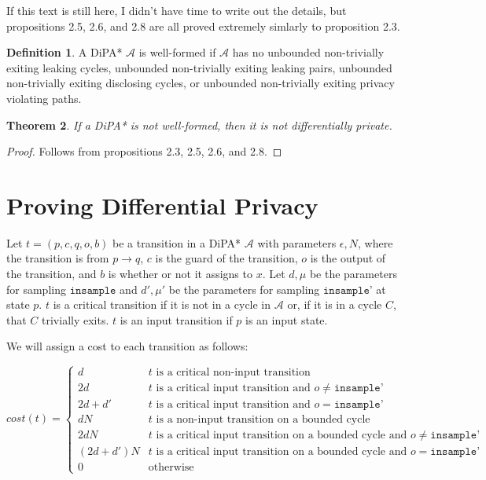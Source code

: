 \documentclass[12pt]{article}
\newtheorem{thm}{Theorem}[section]
\theoremstyle{definition}
\newtheorem{defn}[thm]{Definition}
\begin{document}
If this text is still here, I didn't have time to write out the details, but propositions 2.5, 2.6, and 2.8 are all proved extremely simlarly to proposition 2.3.

\begin{defn} 
	A DiPA* $\mathcal{A}$ is well-formed if $\mathcal{A}$ has no unbounded non-trivially exiting leaking cycles, unbounded non-trivially exiting leaking pairs, unbounded non-trivially exiting disclosing cycles, or unbounded non-trivially exiting privacy violating paths.
\end{defn}

\begin{thm} 
	If a DiPA* is not well-formed, then it is not differentially private.
\end{thm}
\begin{proof}
	Follows from propositions 2.3, 2.5, 2.6, and 2.8.
\end{proof}

\section{Proving Differential Privacy}

Let $t = (p, c, q, o, b)$ be a transition in a DiPA* $\mathcal{A}$ with parameters $\epsilon, N$, where the transition is from $p \to q$, $c$ is the guard of the transition, $o$ is the output of the transition, and $b$ is whether or not it assigns to $x$.
Let $d, \mu$ be the parameters for sampling $\texttt{insample}$ and $d', \mu'$ be the parameters for sampling $\texttt{insample'}$ at state $p$. $t$ is a critical transition if it is not in a cycle in $\mathcal{A}$ or, if it is in a cycle $C$, that $C$ trivially exits. $t$ is an input transition if $p$ is an input state.

We will assign a cost to each transition as follows:

\[
	cost(t) = \begin{cases}
		d & t \text{ is a critical non-input transition}\\
		2d & t \text{ is a critical input transition and } o \neq \texttt{insample'}\\
		2d+d' & t \text{ is a critical input transition and }o = \texttt{insample'}\\
		dN & t \text{ is a non-input transition on a bounded cycle}\\
		2dN & t \text{ is a critical input transition on a bounded cycle and } o \neq \texttt{insample'}\\
		(2d+d')N & t \text{ is a critical input transition on a bounded cycle and } o = \texttt{insample'}\\
		0 & \text{otherwise}
	\end{cases}
\]
\end{document}
